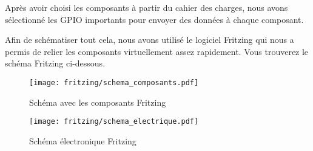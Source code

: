 Après avoir choisi les composants à partir du cahier des charges, nous avons sélectionné les GPIO importants pour envoyer des données à chaque composant.

Afin de schématiser tout cela, nous avons utilisé le logiciel Fritzing qui nous a permis de relier les composants virtuellement assez rapidement. Vous trouverez le schéma Fritzing ci-dessous.

\bigbreak
\begin{figure}[h]
    \centering
    \texttt{[image: fritzing/schema\_composants.pdf]}
    \caption{Schéma avec les composants Fritzing}
    \label{fig:Schéma des composants Fritzing}
\end{figure}

\begin{figure}[h]
    \centering
    \texttt{[image: fritzing/schema\_electrique.pdf]}
    \caption{Schéma électronique Fritzing}
    \label{fig:Schéma électronique Fritzing}
\end{figure}

\clearpage